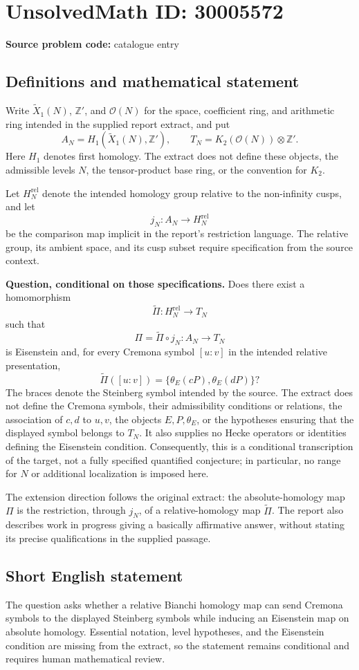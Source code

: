 \documentclass[11pt]{article}
\begin{document}
\section*{UnsolvedMath ID: 30005572}
\textbf{Source problem code:} catalogue entry
\subsection{Definitions and mathematical statement}
Write \(\widetilde X_1(N)\), \(\mathbb Z'\), and \(\mathcal O(N)\) for the space, coefficient ring, and arithmetic ring intended in the supplied report extract, and put
\[
A_N=H_1(\widetilde X_1(N),\mathbb Z'),\qquad
T_N=K_2(\mathcal O(N))\otimes\mathbb Z'.
\]
Here \(H_1\) denotes first homology. The extract does not define these objects, the admissible levels \(N\), the tensor-product base ring, or the convention for \(K_2\).

Let \(H_N^{\mathrm{rel}}\) denote the intended homology group relative to the non-infinity cusps, and let
\[
j_N:A_N\longrightarrow H_N^{\mathrm{rel}}
\]
be the comparison map implicit in the report's restriction language. The relative group, its ambient space, and its cusp subset require specification from the source context.

\textbf{Question, conditional on those specifications.} Does there exist a homomorphism
\[
\widetilde\Pi:H_N^{\mathrm{rel}}\longrightarrow T_N
\]
such that
\[
\Pi=\widetilde\Pi\circ j_N:A_N\longrightarrow T_N
\]
is Eisenstein and, for every Cremona symbol \([u:v]\) in the intended relative presentation,
\[
\widetilde\Pi([u:v])
 =\{\theta_E(cP),\theta_E(dP)\}?
\]
The braces denote the Steinberg symbol intended by the source. The extract does not define the Cremona symbols, their admissibility conditions or relations, the association of \(c,d\) to \(u,v\), the objects \(E,P,\theta_E\), or the hypotheses ensuring that the displayed symbol belongs to \(T_N\). It also supplies no Hecke operators or identities defining the Eisenstein condition. Consequently, this is a conditional transcription of the target, not a fully specified quantified conjecture; in particular, no range for \(N\) or additional localization is imposed here.

The extension direction follows the original extract: the absolute-homology map \(\Pi\) is the restriction, through \(j_N\), of a relative-homology map \(\widetilde\Pi\). The report also describes work in progress giving a basically affirmative answer, without stating its precise qualifications in the supplied passage.
\subsection{Short English statement}
The question asks whether a relative Bianchi homology map can send Cremona symbols to the displayed Steinberg symbols while inducing an Eisenstein map on absolute homology. Essential notation, level hypotheses, and the Eisenstein condition are missing from the extract, so the statement remains conditional and requires human mathematical review.
\end{document}
